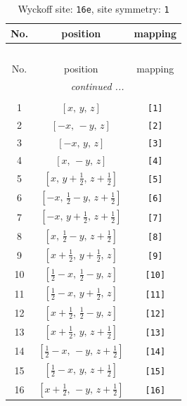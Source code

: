 \documentclass[fleqn,8pt]{jsarticle}
\begin{document}
\begin{longtable}{ccc}
\caption{Wyckoff site: {\tt 16e}, site symmetry: {\tt 1}}
 \\
 \hline \hline
No. & position & mapping \\ \hline \endfirsthead

\multicolumn{2}{l}{\tablename\ \thetable{}} \\
 \hline \hline
No. & position & mapping \\ \hline \endhead

 \hline \hline
\multicolumn{2}{r}{\footnotesize\it continued ...} \\ \endfoot

 \hline \hline
\multicolumn{2}{r}{} \\ \endlastfoot

1 & $\left[ x,\, y,\, z \right]$ & {\tt [1]} \\ \hline
2 & $\left[ - x,\, - y,\, z \right]$ & {\tt [2]} \\ \hline
3 & $\left[ - x,\, y,\, z \right]$ & {\tt [3]} \\ \hline
4 & $\left[ x,\, - y,\, z \right]$ & {\tt [4]} \\ \hline
5 & $\left[ x,\, y + \frac{1}{2},\, z + \frac{1}{2} \right]$ & {\tt [5]} \\ \hline
6 & $\left[ - x,\, \frac{1}{2} - y,\, z + \frac{1}{2} \right]$ & {\tt [6]} \\ \hline
7 & $\left[ - x,\, y + \frac{1}{2},\, z + \frac{1}{2} \right]$ & {\tt [7]} \\ \hline
8 & $\left[ x,\, \frac{1}{2} - y,\, z + \frac{1}{2} \right]$ & {\tt [8]} \\ \hline
9 & $\left[ x + \frac{1}{2},\, y + \frac{1}{2},\, z \right]$ & {\tt [9]} \\ \hline
10 & $\left[ \frac{1}{2} - x,\, \frac{1}{2} - y,\, z \right]$ & {\tt [10]} \\ \hline
11 & $\left[ \frac{1}{2} - x,\, y + \frac{1}{2},\, z \right]$ & {\tt [11]} \\ \hline
12 & $\left[ x + \frac{1}{2},\, \frac{1}{2} - y,\, z \right]$ & {\tt [12]} \\ \hline
13 & $\left[ x + \frac{1}{2},\, y,\, z + \frac{1}{2} \right]$ & {\tt [13]} \\ \hline
14 & $\left[ \frac{1}{2} - x,\, - y,\, z + \frac{1}{2} \right]$ & {\tt [14]} \\ \hline
15 & $\left[ \frac{1}{2} - x,\, y,\, z + \frac{1}{2} \right]$ & {\tt [15]} \\ \hline
16 & $\left[ x + \frac{1}{2},\, - y,\, z + \frac{1}{2} \right]$ & {\tt [16]} \\
\end{longtable}
\end{document}
